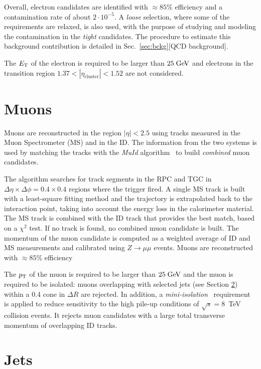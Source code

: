Overall, electron candidates are identified with \mbox{$\approx{}85\%$} 
efficiency and a contamination rate of about \mbox{$2\cdot{}10^{-5}$}.
A {\it loose} selection, where some of the requirements are relaxed, 
is also used, with the purpose of studying and modeling the contamination
in the {\it tight} candidates. The procedure to estimate this background
contribution is detailed in Sec.~\ref{sec:bckg}[QCD background].

The $\mbox{\ensuremath{E_{\mathrm{T}}}}$ of the electron is required to be larger than \mbox{$25 \; \mathrm{GeV}{}$}
and electrons in the transition region $1.37<|\eta_{\mathrm{cluster}}|<1.52$
are not considered.

\section{Muons}
\label{sec:muons}

Muons are reconstructed in the region $|\eta|<2.5$ using tracks measured in the 
Muon Spectrometer (MS) and in the ID.
The information from the two systems is used by matching
the tracks with the {\it MuId} algorithm~\cite{muidalgo} to build 
{\it combined} muon candidates.

The algorithm searches for track segments in the RPC and TGC in
$\Delta\eta\times\Delta\phi=0.4\times0.4$ regions where the trigger
fired. A single MS track is built with a least-square fitting method and
the trajectory is extrapolated back to the interaction point, taking
into account the energy loss in the calorimeter material. 
The MS track is combined with the ID track that provides the best
match, based on a $\chi^2$ test. If no track is found, no combined
muon candidate is built.
The momentum of the muon candidate is computed as a weighted average
of ID and MS measurements and calibrated using $Z\to \mu\mu$ events.
Muons are reconstructed with \mbox{$\approx{}85\%$} efficiency

The $p_{\mathrm{T}}$ of the muon is required to be larger than \mbox{$25 \; \mathrm{GeV}{}$}
and the muon is required to be isolated: muons overlapping with selected
jets (see Section \ref{sec:jets}) within a 0.4 cone in $\Delta R$ are
rejected. In addition, a {\it mini-isolation}~\cite{miniisolation}
requirement is applied to reduce sensitivity to the high pile-up
conditions of $\sqrt{s} = $8~TeV collision events. It rejects muon candidates
with a large total transverse momentum of overlapping ID tracks.

\section{Jets}
\label{sec:jets}

